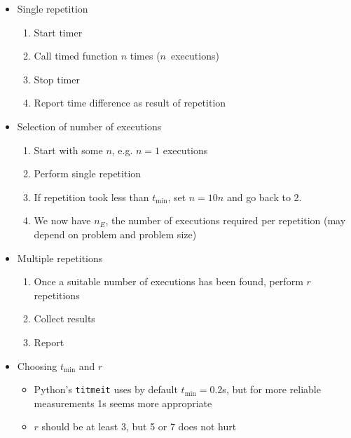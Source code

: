 \documentclass[sigconf, nonacm, natbib, screen, balance=False]{acmart}
\begin{document}
  \begin{itemize}
    \item
    Single repetition

    \begin{enumerate}
    \def\labelenumi{\arabic{enumi}.}
        \item
      Start timer
    \item
      Call timed function \(n\) times (\(n\)~executions)
    \item
      Stop timer
    \item
      Report time difference as result of repetition
    \end{enumerate}
  \item
    Selection of number of executions

    \begin{enumerate}
    \def\labelenumi{\arabic{enumi}.}
        \item
      Start with some \(n\), e.g. \(n=1\) executions
    \item
      Perform single repetition
    \item
      If repetition took less than \(t_{\text{min}}\), set \(n=10n\) and
      go back to 2.
    \item
      We now have \(n_E\), the number of executions required per
      repetition (may depend on problem and problem size)
    \end{enumerate}
  \item
    Multiple repetitions

    \begin{enumerate}
    \def\labelenumi{\arabic{enumi}.}
        \item
      Once a suitable number of executions has been found, perform \(r\)
      repetitions
    \item
      Collect results
    \item
      Report
    \end{enumerate}
\item
  Choosing \(t_{\text{min}}\) and \(r\)

  \begin{itemize}
    \item
    Python's \texttt{titmeit} uses by default \(t_{\text{min}}=0.2\)s,
    but for more reliable measurements 1s seems more appropriate
  \item
    \(r\) should be at least 3, but 5 or 7 does not hurt
  \end{itemize}
\end{itemize}
\end{document}
